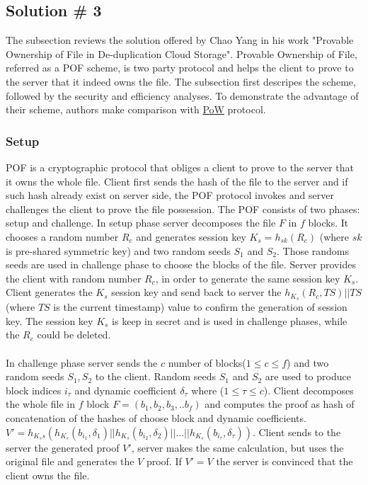 \documentclass[12pt]{article}
\begin{document}
\subsection{Solution \# 3}
\label{sub:Soltuion3}

The subsection reviews the solution offered by Chao Yang in his work "Provable Ownership of File in De-duplication Cloud Storage".\cite{POF} Provable Ownership of File, referred as a POF scheme, is two party protocol and helps the client to prove to the server that it indeed owns the file. The subsection first descripes the scheme, followed by the security and efficiency analyses. To demonstrate the  advantage of their scheme,  authors make comparison with \hyperref[sub:Soltuion1]{PoW} protocol.

\subsubsection{Setup}
\label{subsub:setup3}

POF is a cryptographic protocol that obliges a client to prove to the server that it owns the whole file. Client first sends the hash of the file to the server and if such hash already exist on server side, the POF protocol invokes and server challenges the client to prove the file possession. The POF consists of two phases: setup and challenge. In setup phase server decomposes the file $F$ in $f$ blocks. It chooses a random number  $R_c$  and generates session key $K_s = h_{sk}(R_c)$ (where $sk$ is pre-shared symmetric key) and two random seeds $S_1$ and $S_2$. Those randoms seeds are used in challenge phase to choose the blocks of the  file. Server provides the client with random number $R_c$, in order to generate the same session key $K_s$. Client generates the $K_s$ session key and  send back to server the $h_{K_s}(R_c, TS)||TS$ (where $TS$ is the current timestamp) value to confirm the generation of session key.  The session key $K_s$ is keep in secret and is used in challenge phases, while the $R_c$ could be deleted.\\\\
In challenge phase server sends the $c$ number of blocks($1 \leqslant c \leqslant f $) and two random seeds $S_1,S_2$ to the client. Random seeds $S_1$ and $S_2$ are used to produce block indices $i_\tau$ and dynamic coefficient $\delta_\tau$  where ($1 \leqslant \tau \leqslant c$). Client decomposes the whole  file in $f$ block $F=(b_1,b_2,b_3,..b_f)$ and computes the proof as hash of concatenation of the hashes of choose block and dynamic coefficients.  $V' = h_{K_ss}(h_{K_s}(b_{i_1},\delta_1)||h_{K_s}(b_{i_2},\delta_2)|| ...||h_{K_s}(b_{i_\tau},\delta_\tau))$. Client sends to the server the generated proof $V'$, server makes the same calculation, but uses the original file and generates the $V$ proof. If $V'=V$ the server is convinced that the client  owns the file. 
 
\end{document}
